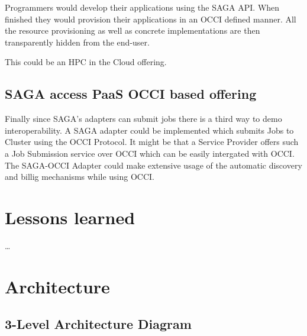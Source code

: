 \documentclass[10pt,conference,final,letterpaper,twoside,twocolumn,]{IEEEtran}
\begin{document}
Programmers would develop their applications using the SAGA API. When
finished they would provision their applications in an OCCI defined
manner. All the resource provisioning as well as concrete
implementations are then transparently hidden from the end-user.

This could be an HPC in the Cloud offering.

\subsection{SAGA access PaaS OCCI based offering}
Finally since SAGA's adapters can submit jobs there is a third way to
demo interoperability. A SAGA adapter could be implemented which
submits Jobs to Cluster using the OCCI Protocol. It might be that a
Service Provider offers such a Job Submission service over OCCI which
can be easily intergated with OCCI. The SAGA-OCCI Adapter could make
extensive usage of the automatic discovery and billig mechanisms while
using OCCI.

\section{Lessons learned}
\label{sec:lessons}

\ldots

\section{Architecture}
\label{sec:arch}

\subsection{3-Level Architecture Diagram}



\end{document}
